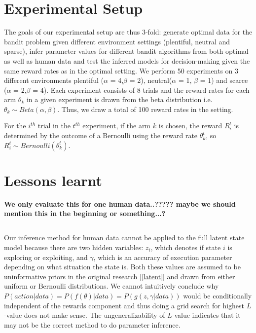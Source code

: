 \section{Experimental Setup}
The goals of our experimental setup are thus 3-fold: generate optimal data for the bandit problem given different environment settings (plentiful, neutral and sparse), infer parameter values for different bandit algorithms from both optimal as well as human data and test the inferred models for decision-making given the same reward rates as in the optimal setting. 
We perform 50 experiments on 3 different environments plentiful ($\alpha$ = 4,$\beta$ = 2), neutral($\alpha$ = 1, $\beta$ = 1) and scarce ($\alpha$ = 2,$\beta$ = 4). Each experiment consists of 8 trials and the reward rates for each arm $\theta_k$ in a given experiment is drawn from the beta distribution i.e. $\theta_k \sim Beta (\alpha, \beta)$. Thus, we draw a total of 100 reward rates in the setting. 

For the $i^{th}$ trial in the $t^{th}$ experiment, if the arm $k$ is chosen, the reward $R_i^t$ is determined by the outcome of a Bernoulli using the reward rate $\theta_k^t$, so $R_i^t \sim Bernoulli (\theta_k^t)$.


\section{Lessons learnt}
\textbf{We only evaluate this for one human data..????? maybe we should mention this in the beginning or something...?}

\subsection{}
Our inference method for human data cannot be applied to the full latent state model because there are two hidden variables: $z_i$, which denotes if state $i$ is exploring or exploiting, and $\gamma$, which is an accuracy of execution parameter depending on what situation the state is. Both these values are assumed to be uninformative priors in the original research [\ref{latent}] and drawn from either uniform or Bernoulli distributions. We cannot intuitively conclude why $P(action|data) = P(f(\theta)|data) = P(g(z,\gamma|data))$ would be conditionally independent of the rewards component and thus doing a grid search for highest $L$-value does not make sense. The ungeneralizability of $L$-value indicates that it may not be the correct method to do parameter inference.
